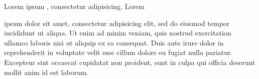 \documentclass{article}
\begin{document}
Lorem ipsum , consectetur adipisicing. Lorem

ipsum dolor sit amet, consectetur adipisicing elit, sed do eiusmod
tempor incididunt ut  aliqua. Ut enim
ad minim veniam, quis nostrud exercitation ullamco laboris nisi ut
aliquip ex ea  consequat. Duis aute irure dolor in
reprehenderit in voluptate velit esse cillum dolore eu fugiat nulla
pariatur. Excepteur sint occaecat cupidatat non proident, sunt in culpa
qui officia deserunt mollit anim id est laborum.
\end{document}
